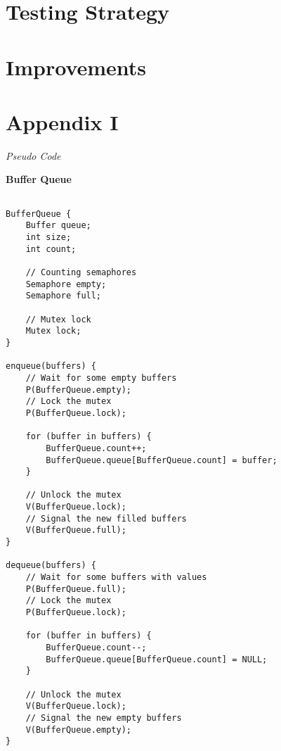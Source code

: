 \documentclass[12pt]{article}
\newcommand {\filename}[1] {\flushleft \textbf{#1}}
\newcommand {\append}[2] {\section*{Appendix #1} \textsl{\large #2}}
\begin{document}
\section*{Testing Strategy}


\section*{Improvements}


\newpage
\append{I} {Pseudo Code}

\filename{Buffer Queue}
\begin{scriptsize}
\begin{verbatim}

BufferQueue {
    Buffer queue;
    int size;
    int count;

    // Counting semaphores
    Semaphore empty;
    Semaphore full;

    // Mutex lock
    Mutex lock;
}

enqueue(buffers) {
    // Wait for some empty buffers
    P(BufferQueue.empty);
    // Lock the mutex
    P(BufferQueue.lock);

    for (buffer in buffers) {
        BufferQueue.count++;
        BufferQueue.queue[BufferQueue.count] = buffer;
    }

    // Unlock the mutex
    V(BufferQueue.lock);
    // Signal the new filled buffers
    V(BufferQueue.full);
}

dequeue(buffers) {
    // Wait for some buffers with values
    P(BufferQueue.full);
    // Lock the mutex
    P(BufferQueue.lock);

    for (buffer in buffers) {
        BufferQueue.count--;
        BufferQueue.queue[BufferQueue.count] = NULL;
    }
    
    // Unlock the mutex
    V(BufferQueue.lock);
    // Signal the new empty buffers
    V(BufferQueue.empty);
}

\end{verbatim}
\end{scriptsize}
\end{document}
